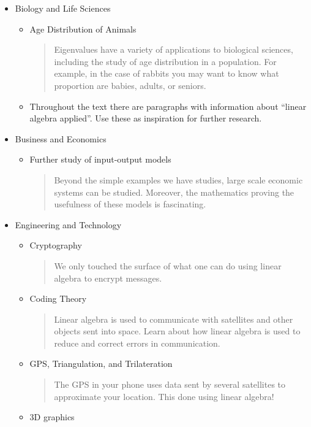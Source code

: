 \documentclass{article}
\begin{document}
\begin{itemize}
	\item Biology and Life Sciences
		\begin{itemize}
			\item Age Distribution of Animals 
				\begin{quote}
					Eigenvalues have a variety of applications to biological sciences, including the study of age distribution in a population.  For example, in the case of rabbits you may want to know what proportion are babies, adults, or seniors.
				\end{quote}
			\item Throughout the text there are paragraphs with information about ``linear algebra applied''.  Use these as inspiration for further research.
		\end{itemize}
	\item Business and Economics
		\begin{itemize}
			\item Further study of input-output models
				\begin{quote}
					Beyond the simple examples we have studies, large scale economic systems can be studied.  Moreover, the mathematics proving the usefulness of these models is fascinating.
				\end{quote}
		\end{itemize}
	\item Engineering and Technology
		\begin{itemize}
			\item Cryptography
				\begin{quote}
					We only touched the surface of what one can do using linear algebra to encrypt messages.
				\end{quote}
			\item Coding Theory
				\begin{quote}
					Linear algebra is used to communicate with satellites and other objects sent into space.  Learn about how linear algebra is used to reduce and correct errors in communication.
				\end{quote}
			\item GPS, Triangulation, and Trilateration
				\begin{quote}
					The GPS in your phone uses data sent by several satellites to approximate your location. This done using linear algebra!
				\end{quote}
			\item 3D graphics
				\begin{quote}

\end{quote}
\end{itemize}
\end{itemize}
\end{document}

